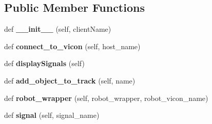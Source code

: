 \subsection*{Public Member Functions}
\begin{DoxyCompactItemize}
\item 
def {\bfseries \+\_\+\+\_\+init\+\_\+\+\_\+} (self, client\+Name)\hypertarget{classdg__blmc__robots_1_1vicon__client__bullet_1_1ViconClientEntityBullet_abd17b337138290f9f3c6abd34ac2cd53}{}\label{classdg__blmc__robots_1_1vicon__client__bullet_1_1ViconClientEntityBullet_abd17b337138290f9f3c6abd34ac2cd53}

\item 
def {\bfseries connect\+\_\+to\+\_\+vicon} (self, host\+\_\+name)\hypertarget{classdg__blmc__robots_1_1vicon__client__bullet_1_1ViconClientEntityBullet_a2124aec6b0a1fbf46384da27592d0ed5}{}\label{classdg__blmc__robots_1_1vicon__client__bullet_1_1ViconClientEntityBullet_a2124aec6b0a1fbf46384da27592d0ed5}

\item 
def {\bfseries display\+Signals} (self)\hypertarget{classdg__blmc__robots_1_1vicon__client__bullet_1_1ViconClientEntityBullet_afdf5d88a0ee499f5130832dfc802274d}{}\label{classdg__blmc__robots_1_1vicon__client__bullet_1_1ViconClientEntityBullet_afdf5d88a0ee499f5130832dfc802274d}

\item 
def {\bfseries add\+\_\+object\+\_\+to\+\_\+track} (self, name)\hypertarget{classdg__blmc__robots_1_1vicon__client__bullet_1_1ViconClientEntityBullet_a93269b2f385b01a0b0c72aef9a592ff7}{}\label{classdg__blmc__robots_1_1vicon__client__bullet_1_1ViconClientEntityBullet_a93269b2f385b01a0b0c72aef9a592ff7}

\item 
def {\bfseries robot\+\_\+wrapper} (self, robot\+\_\+wrapper, robot\+\_\+vicon\+\_\+name)\hypertarget{classdg__blmc__robots_1_1vicon__client__bullet_1_1ViconClientEntityBullet_a2bb0457c535787ffb3c90afaee5f5f7e}{}\label{classdg__blmc__robots_1_1vicon__client__bullet_1_1ViconClientEntityBullet_a2bb0457c535787ffb3c90afaee5f5f7e}

\item 
def {\bfseries signal} (self, signal\+\_\+name)\hypertarget{classdg__blmc__robots_1_1vicon__client__bullet_1_1ViconClientEntityBullet_ab2bba7bf682cdbc1d30f044bbe4fe72e}{}\label{classdg__blmc__robots_1_1vicon__client__bullet_1_1ViconClientEntityBullet_ab2bba7bf682cdbc1d30f044bbe4fe72e}

\end{DoxyCompactItemize}
